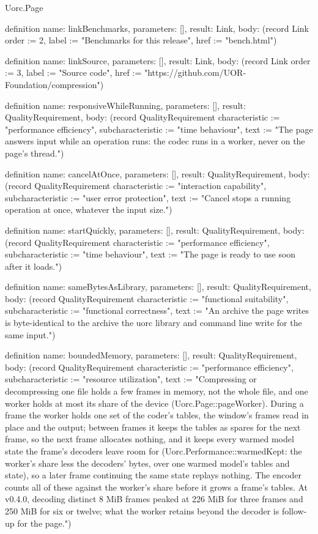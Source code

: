 \begin{lexlean}{Uorc.Page}
\begin{semanticmodule}
definition{
  name: linkBenchmarks,
  parameters: [],
  result: Link,
  body: (record Link {order := 2, label := "Benchmarks for this release", href := "bench.html"})
}

definition{
  name: linkSource,
  parameters: [],
  result: Link,
  body: (record Link {order := 3, label := "Source code", href := "https://github.com/UOR-Foundation/compression"})
}

definition{
  name: responsiveWhileRunning,
  parameters: [],
  result: QualityRequirement,
  body: (record QualityRequirement {characteristic := "performance efficiency", subcharacteristic := "time behaviour", text := "The page answers input while an operation runs: the codec runs in a worker, never on the page's thread."})
}

definition{
  name: cancelAtOnce,
  parameters: [],
  result: QualityRequirement,
  body: (record QualityRequirement {characteristic := "interaction capability", subcharacteristic := "user error protection", text := "Cancel stops a running operation at once, whatever the input size."})
}

definition{
  name: startQuickly,
  parameters: [],
  result: QualityRequirement,
  body: (record QualityRequirement {characteristic := "performance efficiency", subcharacteristic := "time behaviour", text := "The page is ready to use soon after it loads."})
}

definition{
  name: sameBytesAsLibrary,
  parameters: [],
  result: QualityRequirement,
  body: (record QualityRequirement {characteristic := "functional suitability", subcharacteristic := "functional correctness", text := "An archive the page writes is byte-identical to the archive the uorc library and command line write for the same input."})
}

definition{
  name: boundedMemory,
  parameters: [],
  result: QualityRequirement,
  body: (record QualityRequirement {characteristic := "performance efficiency", subcharacteristic := "resource utilization", text := "Compressing or decompressing one file holds a few frames in memory, not the whole file, and one worker holds at most its share of the device (Uorc.Page::pageWorker). During a frame the worker holds one set of the coder's tables, the window's frames read in place and the output; between frames it keeps the tables as spares for the next frame, so the next frame allocates nothing, and it keeps every warmed model state the frame's decoders leave room for (Uorc.Performance::warmedKept: the worker's share less the decoders' bytes, over one warmed model's tables and state), so a later frame continuing the same state replays nothing. The encoder counts all of these against the worker's share before it grows a frame's tables. At v0.4.0, decoding distinct 8 MiB frames peaked at 226 MiB for three frames and 250 MiB for six or twelve; what the worker retains beyond the decoder is follow-up for the page."})
}


\end{semanticmodule}
\end{lexlean}
